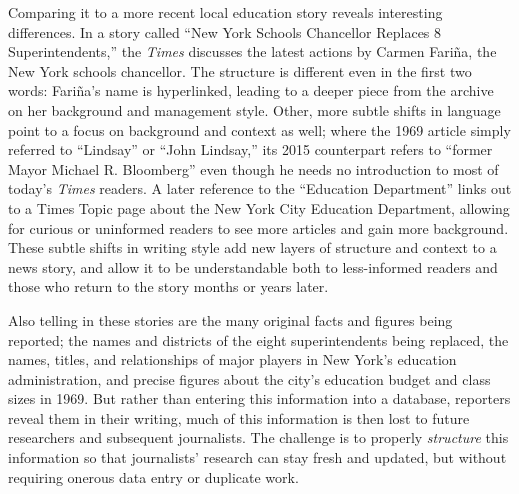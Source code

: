 Comparing it to a more recent local education story reveals interesting differences. In a story called ``New York Schools Chancellor Replaces 8 Superintendents,'' the \emph{Times} discusses the latest actions by Carmen Fari\~{n}a, the New York schools chancellor.\autocite{taylor_new_2014} The structure is different even in the first two words: Fari\~{n}a's name is hyperlinked, leading to a deeper piece from the archive on her background and management style. Other, more subtle shifts in language point to a focus on background and context as well; where the 1969 article simply referred to ``Lindsay'' or ``John Lindsay,'' its 2015 counterpart refers to ``former Mayor Michael R. Bloomberg'' even though he needs no introduction to most of today's \emph{Times} readers. A later reference to the ``Education Department'' links out to a Times Topic page about the New York City Education Department, allowing for curious or uninformed readers to see more articles and gain more background. These subtle shifts in writing style add new layers of structure and context to a news story, and allow it to be understandable both to less-informed readers and those who return to the story months or years later.

Also telling in these stories are the many original facts and figures being reported; the names and districts of the eight superintendents being replaced, the names, titles, and relationships of major players in New York's education administration, and precise figures about the city's education budget and class sizes in 1969. But rather than entering this information into a database, reporters reveal them in their writing, much of this information is then lost to future researchers and subsequent journalists. The challenge is to properly \emph{structure} this information so that journalists' research can stay fresh and updated, but without requiring onerous data entry or duplicate work.

